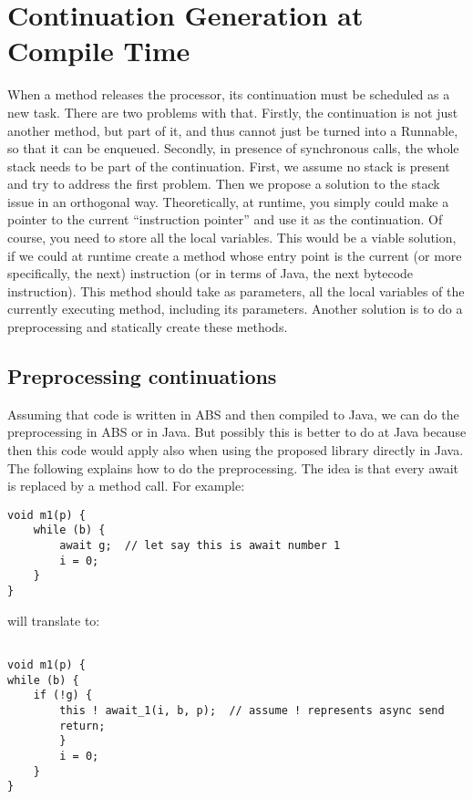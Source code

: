\section{Continuation Generation at Compile Time}
\label{comp}

When a method releases the processor, its continuation must be scheduled as a new task. There are two problems with that. Firstly, the continuation is not just another method, but part of it, and thus cannot just be turned into a Runnable, so that it can be enqueued. Secondly, in presence of synchronous calls, the whole stack needs to be part of the continuation. First, we assume no stack is present and try to address the first problem. Then we propose a solution to the stack issue in an orthogonal way. Theoretically, at runtime, you simply could make a pointer to the current “instruction pointer” and use it as the continuation. Of course, you need to store all the local variables. This would be a viable solution, if we could at runtime create a method whose entry point is the current (or more specifically, the next) instruction (or in terms of Java, the next bytecode instruction). This method should take as parameters, all the local variables of the currently executing method, including its parameters. Another solution is to do a preprocessing and statically create these methods.

\subsection{Preprocessing continuations}
Assuming that code is written in ABS and then compiled to Java, we can do the preprocessing in ABS or in Java. But possibly this is better to do at Java because then this code would apply also when using the proposed library directly in Java. The following explains how to do the preprocessing. The idea is that every await is replaced by a method call. For example:

\begin{lstlisting}
void m1(p) {
	while (b) {
		await g;  // let say this is await number 1
		i = 0;
	}
}
\end{lstlisting}

will translate to:

\begin{lstlisting}

void m1(p) {
while (b) { 
	if (!g) {
		this ! await_1(i, b, p);  // assume ! represents async send 
		return;
		}
		i = 0;
	}
}
\end{lstlisting}

